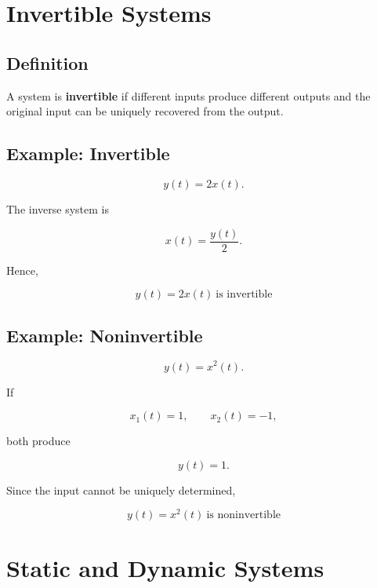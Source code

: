 \section{Invertible Systems}


\subsection{Definition}

A system is \textbf{invertible} if different inputs produce different outputs
and the original input can be uniquely recovered from the output.


\subsection{Example: Invertible}

\[
y(t)=2x(t).
\]

The inverse system is

\[
x(t)=\frac{y(t)}{2}.
\]

Hence,

\[
\boxed{
y(t)=2x(t)\ \text{is invertible}
}
\]


\subsection{Example: Noninvertible}

\[
y(t)=x^2(t).
\]

If

\[
x_1(t)=1,\qquad x_2(t)=-1,
\]

both produce

\[
y(t)=1.
\]

Since the input cannot be uniquely determined,

\[
\boxed{
y(t)=x^2(t)\ \text{is noninvertible}
}
\]


\section{Static and Dynamic Systems}

